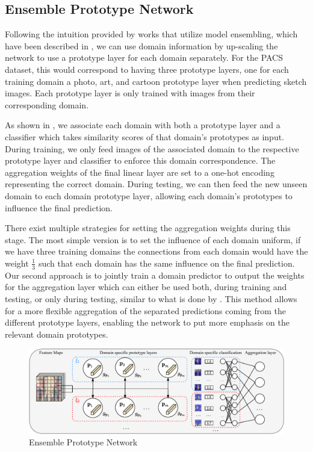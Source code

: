 \subsection{Ensemble Prototype Network}
Following the intuition provided by works that utilize model ensembling, which have been described in , we can use domain information by up-scaling the network to use a prototype layer for each domain separately. For the PACS dataset, this would correspond to having three prototype layers, one for each training domain \eg a photo, art, and cartoon prototype layer when predicting sketch images. Each prototype layer is only trained with images from their corresponding domain.

As shown in , we associate each domain with both a prototype layer and a classifier which takes similarity scores of that domain's prototypes as input. During training, we only feed images of the associated domain to the respective prototype layer and classifier to enforce this domain correspondence. The aggregation weights of the final linear layer are set to a one-hot encoding representing the correct domain. During testing, we can then feed the new unseen domain to each domain prototype layer, allowing each domain's prototypes to influence the final prediction. 

There exist multiple strategies for setting the aggregation weights during this stage. The most simple version is to set the influence of each domain uniform, \ie if we have three training domains the connections from each domain would have the weight $\frac{1}{3}$ such that each domain has the same influence on the final prediction. Our second approach is to jointly train a domain predictor to output the weights for the aggregation layer which can either be used both, during training and testing, or only during testing, similar to what is done by \citet{ManciniBC018}. This method allows for a more flexible aggregation of the separated predictions coming from the different prototype layers, enabling the network to put more emphasis on the relevant domain prototypes.  

\begin{figure}[t]
    \centering
    \includegraphics[width=\textwidth]{Figures/Chapter4/prototype_ensemble-cropped.pdf}
    \caption{Ensemble Prototype Network}
    \label{fig:ensemble_prototype_network}
\end{figure}

